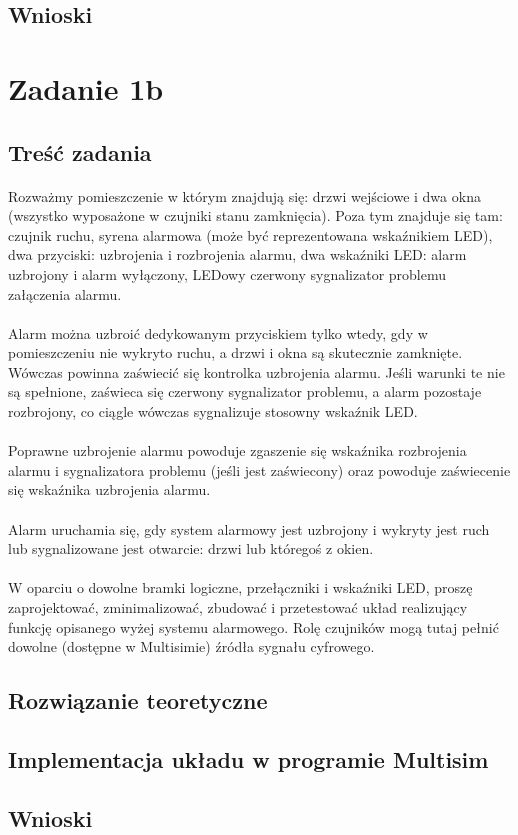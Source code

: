 \documentclass{article}
\begin{document}
\subsection{Wnioski}
\newpage
\section{Zadanie 1b}
\subsection{Treść zadania}
\paragraph{}
Rozważmy pomieszczenie w którym znajdują się: drzwi wejściowe i dwa okna (wszystko wyposażone w czujniki stanu zamknięcia). Poza tym znajduje się tam: czujnik ruchu, syrena alarmowa (może być reprezentowana wskaźnikiem LED), dwa przyciski: uzbrojenia i rozbrojenia alarmu, dwa wskaźniki LED: alarm uzbrojony i alarm wyłączony, LEDowy czerwony sygnalizator problemu załączenia alarmu.
\paragraph{}
Alarm można uzbroić dedykowanym przyciskiem tylko wtedy, gdy w pomieszczeniu nie wykryto ruchu, a drzwi i okna są skutecznie zamknięte. Wówczas powinna zaświecić się kontrolka uzbrojenia alarmu. Jeśli warunki te nie są spełnione, zaświeca się czerwony sygnalizator problemu, a alarm pozostaje rozbrojony, co ciągle wówczas sygnalizuje stosowny wskaźnik LED.
\paragraph{}
Poprawne uzbrojenie alarmu powoduje zgaszenie się wskaźnika rozbrojenia alarmu i sygnalizatora problemu (jeśli jest zaświecony) oraz powoduje zaświecenie się wskaźnika uzbrojenia alarmu.
\paragraph{}
Alarm uruchamia się, gdy system alarmowy jest uzbrojony i wykryty jest ruch lub sygnalizowane jest otwarcie: drzwi lub któregoś z okien.
\paragraph{}
W oparciu o dowolne bramki logiczne, przełączniki i wskaźniki LED, proszę zaprojektować, zminimalizować, zbudować i przetestować układ realizujący funkcję opisanego wyżej systemu alarmowego. Rolę czujników mogą tutaj pełnić dowolne (dostępne w Multisimie) źródła sygnału cyfrowego.
\subsection{Rozwiązanie teoretyczne}
\subsection{Implementacja układu w programie Multisim}
\subsection{Wnioski}
\end{document}

